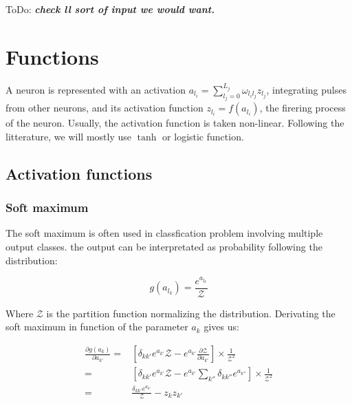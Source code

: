 \documentclass[final, paper=letter,5p,times,twocolumn]{elsarticle}
\newcommand{\ToDo}[1]{ToDo: \textbf{\textit{#1}}}
\begin{document}
\ToDo{check ll sort of input we would want.} \\

\section{Functions}

A neuron is represented with an activation $a_{l_{i}} = \sum_{l_{j} = 0}^{L_{j}} \omega_{l_{i}l_{j}} z_{l_{j}}$, integrating pulses from other neurons, and its activation function $z_{l_{i}} = f(a_{l_{i}})$, the firering process of the neuron. Usually, the activation function is taken non-linear. Following the litterature, we will mostly use $\tanh$ or logistic function.

\subsection{Activation functions}

\subsubsection{Soft maximum}
\label{soft_max_sec}

The soft maximum is often used in classfication problem involving multiple output classes. the output can be interpretated as probability following the distribution:

\begin{equation}
  g(a_{l_{k}}) = \frac{e^{a_{l_{k}}}}{\mathcal{Z}}
  \label{soft_max}
\end{equation}

Where $\mathcal{Z}$ is the partition function normalizing the distribution. Derivating the soft maximum in function of the parameter $a_{k}$ gives us:

\begin{equation*}
  \begin{split}
    \frac{\partial g(a_{k})}{\partial a_{k'}} = & \left \lbrack \delta_{kk'} e^{a_{k'}} \mathcal{Z} - e^{a_{k'}}\frac{\partial \mathcal{Z}}{\partial a_{k'}} \right \rbrack \times \frac{1}{\mathcal{Z}^{2}}\\
    = & \left \lbrack \delta_{kk'} e^{a_{k'}} \mathcal{Z} - e^{a_{k'}} \sum_{k''} \delta_{kk''} e^{a_{k''}}  \right \rbrack \times \frac{1}{\mathcal{Z}^{2}}\\
    = & \frac{\delta_{kk'} e^{a_{k'}}}{\mathcal{Z}} - z_{k}z_{k'}\\
  \end{split}
\end{equation*}
\end{document}
